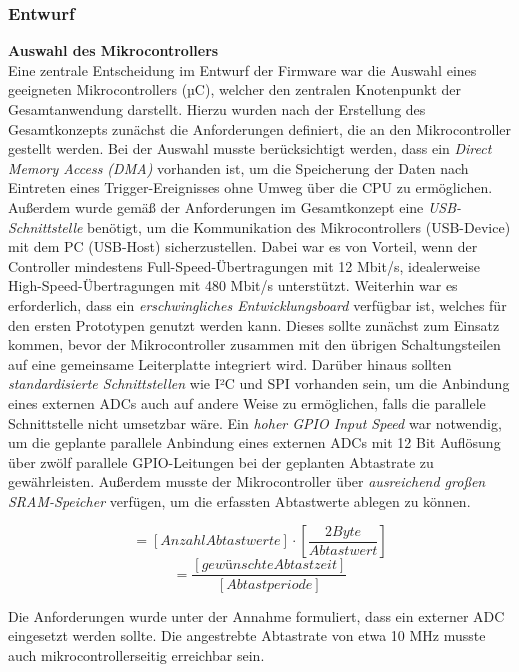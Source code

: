 \documentclass[a4paper, portrait, 12pt]{scrartcl} %
\begin{document}
\subsubsection{Entwurf}
\textbf{Auswahl des Mikrocontrollers}\\
Eine zentrale Entscheidung im Entwurf der Firmware war die Auswahl eines geeigneten Mikrocontrollers (µC), welcher den zentralen Knotenpunkt der Gesamtanwendung darstellt. Hierzu wurden nach der Erstellung des Gesamtkonzepts zunächst die Anforderungen definiert, die an den Mikrocontroller gestellt werden.
Bei der Auswahl musste berücksichtigt werden, dass ein \emph{Direct Memory Access (DMA)} vorhanden ist, um die Speicherung der Daten nach Eintreten eines Trigger-Ereignisses ohne Umweg über die CPU zu ermöglichen. Außerdem wurde gemäß der Anforderungen im Gesamtkonzept eine \emph{USB-Schnittstelle} benötigt, um die Kommunikation des Mikrocontrollers (USB-Device) mit dem PC (USB-Host) sicherzustellen. Dabei war es von Vorteil, wenn der Controller mindestens Full-Speed-Übertragungen mit 12 Mbit/s, idealerweise High-Speed-Übertragungen mit 480 Mbit/s unterstützt. Weiterhin war es erforderlich, dass ein \emph{erschwingliches Entwicklungsboard} verfügbar ist, welches für den ersten Prototypen genutzt werden kann. Dieses sollte zunächst zum Einsatz kommen, bevor der Mikrocontroller zusammen mit den übrigen Schaltungsteilen auf eine gemeinsame Leiterplatte integriert wird. Darüber hinaus sollten \emph{standardisierte Schnittstellen} wie I²C und SPI vorhanden sein, um die Anbindung eines externen ADCs auch auf andere Weise zu ermöglichen, falls die parallele Schnittstelle nicht umsetzbar wäre. Ein \emph{hoher GPIO Input Speed} war notwendig, um die geplante parallele Anbindung eines externen ADCs mit 12 Bit Auflösung über zwölf parallele GPIO-Leitungen bei der geplanten Abtastrate zu gewährleisten. Außerdem musste der Mikrocontroller über \emph{ausreichend großen SRAM-Speicher} verfügen, um die erfassten Abtastwerte ablegen zu können.

\begin{equation}
	[Benötigter Speicher] = [Anzahl Abtastwerte]\cdot \left[\frac{2 Byte}{Abtastwert}\right]
\end{equation}
\begin{equation}
	[Anzahl Abtastwerte] = \frac{[gewünschte Abtastzeit]}{[Abtastperiode]}
\end{equation}

Die Anforderungen wurde unter der Annahme formuliert, dass ein externer ADC eingesetzt werden sollte. Die angestrebte Abtastrate von etwa 10 MHz musste auch mikrocontrollerseitig erreichbar sein.\\
\end{document}
